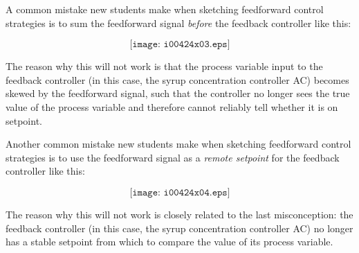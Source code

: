 





A common mistake new students make when sketching feedforward control strategies is to sum the feedforward signal {\it before} the feedback controller like this:

$$\texttt{[image: i00424x03.eps]}$$

The reason why this will not work is that the process variable input to the feedback controller (in this case, the syrup concentration controller AC) becomes skewed by the feedforward signal, such that the controller no longer sees the true value of the process variable and therefore cannot reliably tell whether it is on setpoint.

\filbreak

Another common mistake new students make when sketching feedforward control strategies is to use the feedforward signal as a {\it remote setpoint} for the feedback controller like this:

$$\texttt{[image: i00424x04.eps]}$$

The reason why this will not work is closely related to the last misconception: the feedback controller (in this case, the syrup concentration controller AC) no longer has a stable setpoint from which to compare the value of its process variable.




